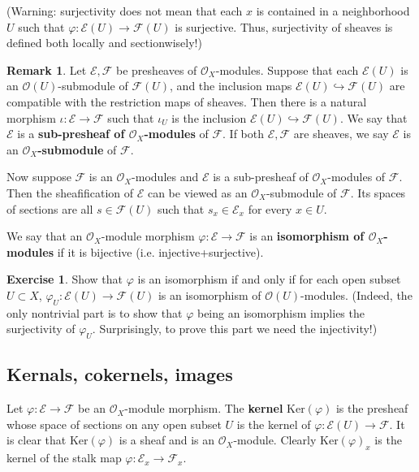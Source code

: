 \documentclass[11pt,b5paper,notitlepage]{article}
\theoremstyle{definition}
\newtheorem{exe}[df]{Exercise}
\newtheorem{rem}[df]{Remark}
\theoremstyle{plain}
\newcommand{\scr}{\mathscr}
\newcommand{\Ker}{\mathrm{Ker}}
\numberwithin{equation}{section}
\begin{document}
(Warning: surjectivity does not mean that each $x$ is contained in a neighborhood $U$ such that $\varphi:\scr E(U)\rightarrow\scr F(U)$ is surjective. Thus, surjectivity of sheaves is defined both locally and sectionwisely!)



\begin{rem}\label{lba102}
	Let $\scr E,\scr F$ be presheaves of $\scr O_X$-modules. Suppose that each $\scr E(U)$ is an $\scr O(U)$-submodule of $\scr F(U)$, and the inclusion maps $\scr E(U)\hookrightarrow\scr F(U)$ are compatible with the restriction maps of sheaves. Then there is a natural  morphism $\iota:\scr E\rightarrow\scr F$ such that $\iota_U$ is the inclusion $\scr E(U)\hookrightarrow\scr F(U)$. We say that $\scr E$ is a \textbf{sub-presheaf of $\scr O_X$-modules}  of $\scr F$. If both $\scr E,\scr F$ are sheaves, we say $\scr E$ is an \textbf{$\scr O_X$-submodule} of $\scr F$.
	
	Now suppose $\scr F$ is an $\scr O_X$-modules and $\scr E$ is a sub-presheaf of $\scr O_X$-modules of $\scr F$. Then the sheafification of $\scr E$ can be viewed as an $\scr O_X$-submodule of $\scr F$. Its spaces of sections are all $s\in\scr F(U)$ such that $s_x\in\scr E_x$ for every $x\in U$. \hfill\qedsymbol
\end{rem}

We say that an $\scr O_X$-module morphism $\varphi:\scr E\rightarrow\scr F$ is an \textbf{isomorphism of $\scr O_X$-modules} if it is bijective (i.e. injective+surjective). 
\begin{exe}
	Show that $\varphi$ is an isomorphism if and only if for each open subset $U\subset X$, $\varphi_U:\scr E(U)\rightarrow\scr F(U)$ is an isomorphism of $\scr O(U)$-modules. (Indeed, the only nontrivial part is to show that $\varphi$ being an isomorphism implies the surjectivity of $\varphi_U$. Surprisingly, to prove this part we need the injectivity!) 
\end{exe}


\subsection{Kernals, cokernels, images}


Let $\varphi:\scr E\rightarrow\scr F$ be an $\scr O_X$-module morphism. The \textbf{kernel} $\Ker(\varphi)$ is the presheaf whose space of sections on any open subset $U$ is the kernel of $\varphi:\scr E(U)\rightarrow\scr F$. It is clear that $\Ker(\varphi)$ is a sheaf and is an $\scr O_X$-module. Clearly $\Ker(\varphi)_x$ is the kernel of the stalk map $\varphi:\scr E_x\rightarrow\scr F_x$.
\end{document}
